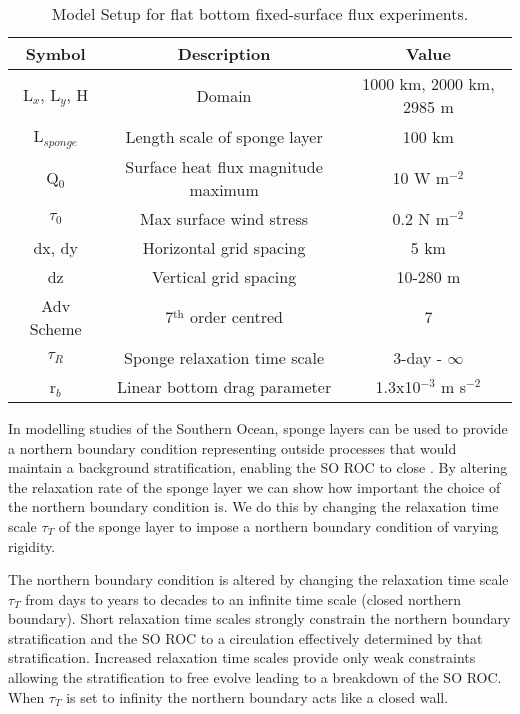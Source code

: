 \begin{table}
\caption{Model Setup for flat bottom fixed-surface flux experiments.}
\label{tab:setup1}
\begin{center}
\begin{tabular}{|c|c|c|}
\hline \hline
\textbf{Symbol} & \textbf{Description}  & \textbf{Value} \\ 
\hline 
L$_x$, L$_y$, H & Domain & 1000 km, 2000 km, 2985 m \\ 
\hline 
L$_{sponge}$ & Length scale of sponge layer & 100 km \\ 
\hline 
Q$_0$ & Surface heat flux magnitude maximum & 10 W m$^{-2}$ \\ 
\hline 
$\tau _0$ & Max surface wind stress & 0.2 N m$^{-2}$  \\ 
\hline 
dx, dy & Horizontal grid spacing & 5 km  \\ 
\hline 
dz & Vertical grid spacing & 10-280 m \\ 
\hline 
Adv Scheme & 7$^{\text{th}}$ order centred & 7 \\ 
\hline 
$\tau_{R}$ & Sponge relaxation time scale & 3-day - $\infty$ \\ 
\hline 
r$_b $& Linear bottom drag parameter & 1.3x10$^{-3}$ m s$^{-2}$ \\ 
\hline 
\end{tabular}
\end{center}
\end{table}

In modelling studies of the Southern Ocean, sponge layers can be used to provide a northern boundary condition representing outside processes that would maintain a background stratification, enabling the SO ROC to close \citep{Abernathey2011,Abernathey2014,Zhai2014}. By altering the relaxation rate of the sponge layer we can show how important the choice of the northern boundary condition is. We do this by changing the relaxation time scale $\tau_{T}$ of the sponge layer to impose a northern boundary condition of varying rigidity.

The northern boundary condition is altered by changing the relaxation time scale $\tau_{T}$ from days to years to decades to an infinite time scale (closed northern boundary). Short relaxation time scales strongly constrain the northern boundary stratification and the SO ROC to a circulation effectively determined by that stratification. Increased relaxation time scales provide only weak constraints allowing the stratification to free evolve leading to a breakdown of the SO ROC. When $\tau_T$ is set to infinity the northern boundary acts like a closed wall.

